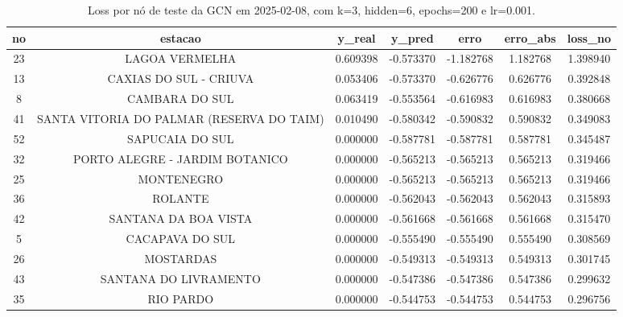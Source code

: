\begin{table}[h]
\centering
\caption{Loss por nó de teste da GCN em 2025-02-08, com k=3, hidden=6, epochs=200 e lr=0.001.}
\label{tab:gcn_loss_nodes_k3_hidden6}
\begin{tabular}{ccccccc}
\toprule
no & estacao & y\_real & y\_pred & erro & erro\_abs & loss\_no \\
\midrule
23 & LAGOA VERMELHA & 0.609398 & -0.573370 & -1.182768 & 1.182768 & 1.398940 \\
13 & CAXIAS DO SUL - CRIUVA & 0.053406 & -0.573370 & -0.626776 & 0.626776 & 0.392848 \\
8 & CAMBARA DO SUL & 0.063419 & -0.553564 & -0.616983 & 0.616983 & 0.380668 \\
41 & SANTA VITORIA DO PALMAR (RESERVA DO TAIM) & 0.010490 & -0.580342 & -0.590832 & 0.590832 & 0.349083 \\
52 & SAPUCAIA DO SUL & 0.000000 & -0.587781 & -0.587781 & 0.587781 & 0.345487 \\
32 & PORTO ALEGRE - JARDIM BOTANICO & 0.000000 & -0.565213 & -0.565213 & 0.565213 & 0.319466 \\
25 & MONTENEGRO & 0.000000 & -0.565213 & -0.565213 & 0.565213 & 0.319466 \\
36 & ROLANTE & 0.000000 & -0.562043 & -0.562043 & 0.562043 & 0.315893 \\
42 & SANTANA DA BOA VISTA & 0.000000 & -0.561668 & -0.561668 & 0.561668 & 0.315470 \\
5 & CACAPAVA DO SUL & 0.000000 & -0.555490 & -0.555490 & 0.555490 & 0.308569 \\
26 & MOSTARDAS & 0.000000 & -0.549313 & -0.549313 & 0.549313 & 0.301745 \\
43 & SANTANA DO LIVRAMENTO & 0.000000 & -0.547386 & -0.547386 & 0.547386 & 0.299632 \\
35 & RIO PARDO & 0.000000 & -0.544753 & -0.544753 & 0.544753 & 0.296756 \\
\bottomrule
\end{tabular}
\end{table}
